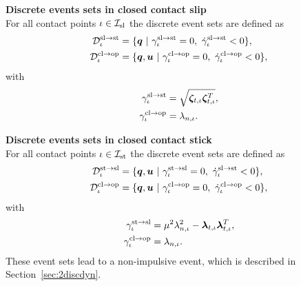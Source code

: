 \documentclass[../DC2017114Bouma.tex]{subfiles}
\begin{document}
\textbf{Discrete events sets in closed contact slip}\\
For all contact points $\iota\in\mathcal{I}_{\text{sl}}$ the discrete event sets are defined as
\begin{align}
\mathcal{D}^{\text{sl}\rightarrow\text{st}}_{\iota} &= \{ \qb\ |\ \gamma^{\text{sl}\rightarrow\text{st}}_{\iota} = 0,\ \dot{\gamma}^{\text{sl}\rightarrow\text{st}}_{\iota} < 0\},\label{eq:2Dslst}\\
\mathcal{D}^{\text{cl}\rightarrow\text{op}}_{\iota} &= \{ \qb,\ub\ |\ \gamma^{\text{cl}\rightarrow\text{op}}_{\iota} = 0,\ \dot{\gamma}^{\text{cl}\rightarrow\text{op}}_{\iota} < 0\},\label{eq:2Dslop}
\end{align}
with 
\begin{align}
\gamma^{\text{sl}\rightarrow\text{st}}_{\iota} &= \sqrt{\boldsymbol{\zeta}_{t,\iota}\boldsymbol{\zeta}_{t,\iota}^T},\\
\gamma^{\text{cl}\rightarrow\text{op}}_{\iota} &= \lambda_{n,\iota}.
\end{align}

\textbf{Discrete events sets in closed contact stick}\\
For all contact points $\iota\in\mathcal{I}_{\text{st}}$ the discrete event sets are defined as
\begin{align}
\mathcal{D}^{\text{st}\rightarrow\text{sl}}_{\iota} &= \{ \qb,\ub\ |\ \gamma^{\text{st}\rightarrow\text{sl}}_{\iota} = 0,\ \dot{\gamma}^{\text{sl}\rightarrow\text{st}}_{\iota} < 0\},\label{eq:2Dstsl}\\
\mathcal{D}^{\text{cl}\rightarrow\text{op}}_{\iota} &= \{ \qb,\ub\ |\ \gamma^{\text{cl}\rightarrow\text{op}}_{\iota} = 0,\ \dot{\gamma}^{\text{cl}\rightarrow\text{op}}_{\iota} < 0\},\label{eq:2Dstop}
\end{align}
with 
\begin{align}
\gamma^{\text{st}\rightarrow\text{sl}}_{\iota} &= \mu^2\lambda_{n,\iota}^2-\boldsymbol{\lambda}_{t,\iota}\boldsymbol{\lambda}_{t,\iota}^T,\\
\gamma^{\text{cl}\rightarrow\text{op}}_{\iota} &= \lambda_{n,\iota}.
\end{align}
These event sets lead to a non-impulsive event, which is described in Section~\ref{sec:2discdyn}.
\end{document}
